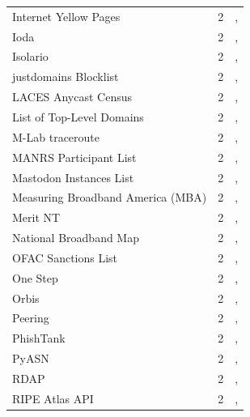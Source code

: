 \documentclass[11pt,a4paper]{article}
\begin{document}
\begin{longtable}{@{}p{} p{}p{}@{}}
Internet Yellow Pages & 2 & \cite{10.1007/978-3-031-85960-1_13}, \cite{10.1145/3777912.3809141} \\
Ioda & 2 & \cite{10.1007/978-3-031-85960-1_13}, \cite{10.1145/3777912.3809143} \\
Isolario  & 2 & \cite{10.1145/3487552.3487865}, \cite{10.1007/978-3-030-98785-5_10} \\
justdomains Blocklist  & 2 & \cite{10.1007/978-3-031-28486-1_26}, \cite{10.1007/978-3-031-85960-1_8} \\
LACES Anycast Census & 2 & \cite{10.1145/3777912.3839831}, \cite{10.1145/3777912.3839828} \\
List of Top-Level Domains  & 2 & \cite{10.1007/978-3-031-28486-1_22}, \cite{10.1007/978-3-031-56249-5_9} \\
M-Lab traceroute  & 2 & \cite{10.1145/3618257.3624809}, \cite{10.1145/3517745.3561449} \\
MANRS Participant List & 2 & \cite{10.1007/978-3-030-98785-5_14}, \cite{10.1145/3517745.3561419} \\
Mastodon Instances List  & 2 & \cite{10.1145/3646547.3689027}, \cite{10.1145/3618257.3624820} \\
Measuring Broadband America (MBA)  & 2 & \cite{10.1145/3517745.3561441}, \cite{10.1007/978-3-030-72582-2_2} \\
Merit NT & 2 & \cite{10.1145/3777912.3839790}, \cite{10.1007/978-3-032-18268-5_14} \\
National Broadband Map  & 2 & \cite{10.1145/3646547.3688441}, \cite{10.1007/978-3-031-85960-1_20} \\
OFAC Sanctions List & 2 & \cite{10.1145/3618257.3624824}, \cite{10.1145/3517745.3561423} \\
One Step  & 2 & \cite{10.1145/3618257.3624838}, \cite{10.1007/978-3-030-98785-5_10} \\
Orbis  & 2 & \cite{10.1145/3487552.3487822}, \cite{10.1007/978-3-030-98785-5_30} \\
Peering & 2 & \cite{10.1145/3517745.3561421}, \cite{10.1007/978-3-032-18268-5_3} \\
PhishTank  & 2 & \cite{10.1145/3487552.3487857}, \cite{10.1007/978-3-031-28486-1_24} \\
PyASN  & 2 & \cite{10.1145/3487552.3487854}, \cite{10.1007/978-3-031-85960-1_9} \\
RDAP  & 2 & \cite{10.1007/978-3-031-56249-5_9}, \cite{10.1007/978-3-031-56249-5_10} \\
RIPE Atlas API & 2 & \cite{10.1145/3777912.3839804}, \cite{10.1145/3777912.3809149} \\

\end{longtable}
\end{document}
